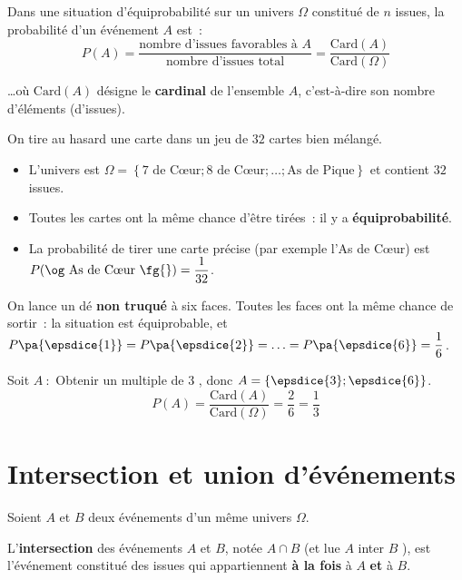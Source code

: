 \begin{prop}
	Dans une situation d'équiprobabilité sur un univers $\Omega$ constitué de $n$ issues, la probabilité d'un événement $A$ est~:
	\[
		P(A) = \dfrac{\text{nombre d'issues favorables à } A}{\text{nombre d'issues total}} = \dfrac{\text{Card}(A)}{\text{Card}(\Omega)}
	\]

	\ldots où $\text{Card}(A)$ désigne le \textbf{cardinal} de l'ensemble $A$, c'est-à-dire son nombre d'éléments (d'issues).
\end{prop}

\begin{ex}
	On tire au hasard une carte dans un jeu de $32$ cartes bien mélangé.
	\begin{itemize}
		\item L'univers est $\Omega = \left\{ \text{7 de C\oe{}ur} ; \text{8 de C\oe{}ur} ; \ldots ; \text{As de Pique} \right\}$ et contient $32$ issues.
		\item Toutes les cartes ont la même chance d'être tirées~: il y a \textbf{équiprobabilité}.
		\item La probabilité de tirer une carte précise (par exemple l'As de C\oe{}ur) est $P(\text{\og As de C\oe{}ur \fg{}}) = \dfrac{1}{32}$.
	\end{itemize}
\end{ex}

\begin{ex}
	On lance un dé \textbf{non truqué} à six faces. Toutes les faces ont la même chance de sortir~: la situation est équiprobable, et $P\pa{\epsdice{1}} = P\pa{\epsdice{2}} = \ldots = P\pa{\epsdice{6}} = \dfrac{1}{6}$.

	Soit $A~:$ \og Obtenir un multiple de 3 \fg{}, donc $A = \left\{ \epsdice{3};\epsdice{6} \right\}$.
	\[
		P(A) = \dfrac{\text{Card}(A)}{\text{Card}(\Omega)} = \dfrac{2}{6} = \dfrac{1}{3}
	\]
\end{ex}

\section{Intersection et union d'événements}

\begin{defin}
	Soient $A$ et $B$ deux événements d'un même univers $\Omega$.

	L'\textbf{intersection} des événements $A$ et $B$, notée $A \cap B$ (et lue \og $A$ inter $B$ \fg{}), est l'événement constitué des issues qui appartiennent \textbf{à la fois} à $A$ \textbf{et} à $B$.
\end{defin}

